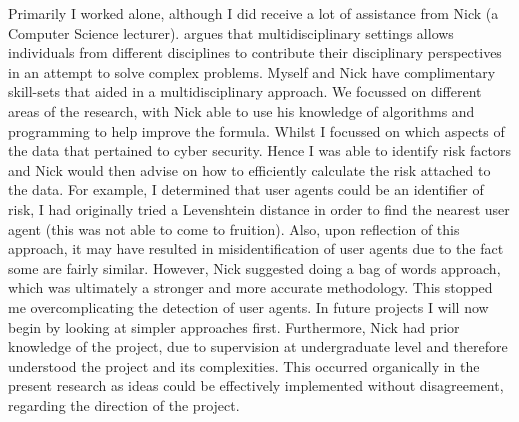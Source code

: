 Primarily I worked alone, although I did receive a lot of assistance from Nick (a Computer Science lecturer). \cite{thurow1999dynamics} argues that multidisciplinary settings allows individuals from different disciplines to contribute their disciplinary perspectives in an attempt to solve complex problems. Myself and Nick have complimentary skill-sets that aided in a multidisciplinary approach. We focussed on different areas of the research, with Nick able to use his knowledge of algorithms and programming to help improve the formula. Whilst I focussed on which aspects of the data that pertained to cyber security. Hence I was able to identify risk factors and Nick would then advise on how to efficiently calculate the risk attached to the data. For example, I determined that user agents could be an identifier of risk, I had originally tried a Levenshtein distance in order to find the nearest user agent (this was not able to come to fruition). Also, upon reflection of this approach, it may have resulted in misidentification of user agents due to the fact some are fairly similar. However, Nick suggested doing a bag of words approach, which was ultimately a stronger and more accurate methodology. This stopped me overcomplicating the detection of user agents. In future projects I will now begin by looking at simpler approaches first. Furthermore, Nick had prior knowledge of the project, due to supervision at undergraduate level and therefore understood the project and its complexities. This occurred organically in the present research as ideas could be effectively implemented without disagreement, regarding the direction of the project. 


